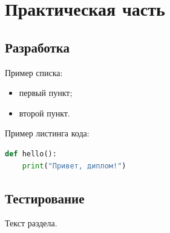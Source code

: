 \chapter{Практическая часть}

\section{Разработка}

Пример списка:
\begin{itemize}
  \item первый пункт;
  \item второй пункт.
\end{itemize}

Пример листинга кода:
\begin{lstlisting}[language=Python]
def hello():
    print("Привет, диплом!")
\end{lstlisting}

\section{Тестирование}

Текст раздела.
